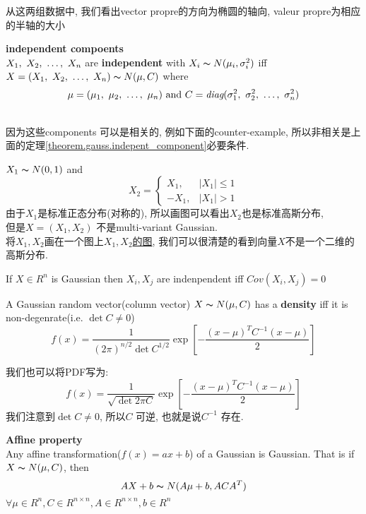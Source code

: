 \documentclass{article}
\begin{document}
从这两组数据中, 我们看出vector propre的方向为椭圆的轴向, valeur propre为相应的半轴的大小

\begin{theorem}
\textbf{independent compoents}\\
$X_1,~X_2,~\ldots,~X_n$ are \textbf{independent} with $X_i \thicksim{N}(\mu_i, \sigma_i^2)$ iff $X = (X_1,~X_2,~\ldots,~X_n) \thicksim{N}(\mu, C)$ where
$$\mu = (\mu_1,~\mu_2,~\ldots,~\mu_n) \hbox{ and } C = \textit{diag}(\sigma^2_1,~\sigma^2_2,~\ldots,~\sigma^2_n)$$
\label{theorem.gauss.indepent_component}
\end{theorem}

\\
因为这些components 可以是相关的, 例如下面的counter-example, 所以非相关是上面的定理\ref{theorem.gauss.indepent_component}必要条件.
\begin{example}
$X_1 \thicksim{N}(0,1)$ and
$$
X_2 =
    \left\{
       \begin{array}{ll}
          X_1, & |X_1| \leq 1 \\
          - X_1, & |X_1| > 1
        \end{array}
    \right.
$$
由于$X_1$是标准正态分布(对称的), 所以画图可以看出$X_2$也是标准高斯分布,\\
但是$X=(X_1, X_2)$ 不是multi-variant Gaussian.\\
将$X_1, X_2$画在一个图上\href{http://i.imgbox.com/gmRq7VFK.png}{$X_1, X_2$的图}, 我们可以很清楚的看到向量$X$不是一个二维的高斯分布.
\end{example}

\begin{theorem}
If $X \in R^n$ is Gaussian then $X_i, X_j$ are indenpendent iff $Cov(X_i, X_j) = 0$
\end{theorem}

\begin{theorem}
A Gaussian random vector(column vector) $X \thicksim{N}(\mu, C)$ has a \textbf{density} iff it is non-degenrate(i.e. $\det{C} \neq 0$)
$$
f(x) = \frac{1}{(2\pi)^{n/2} \det{C}^{1/2}} \exp[- \frac{(x - \mu)^T C^{-1} (x - \mu)}{2}]
$$
\end{theorem}
我们也可以将PDF写为:
$$
f(x) = \frac{1}{\sqrt{\det{2 \pi C}}} \exp[- \frac{(x - \mu)^T C^{-1} (x - \mu)}{2}]
$$
我们注意到$\det{C} \neq 0$, 所以$C$ 可逆, 也就是说$C^{-1}$ 存在.

\begin{theorem}
\textbf{Affine property}\\
Any affine transformation($f(x) = ax + b$) of a Gaussian is Gaussian. That is if $X \thicksim{N}(\mu, C)$, then
$$AX+b \thicksim{N}(A\mu + b, ACA^T)$$
$\forall \mu \in R^n, C \in R^{n \times n}, A \in R^{n \times n}, b \in R^n$
\end{theorem}
\end{document}
